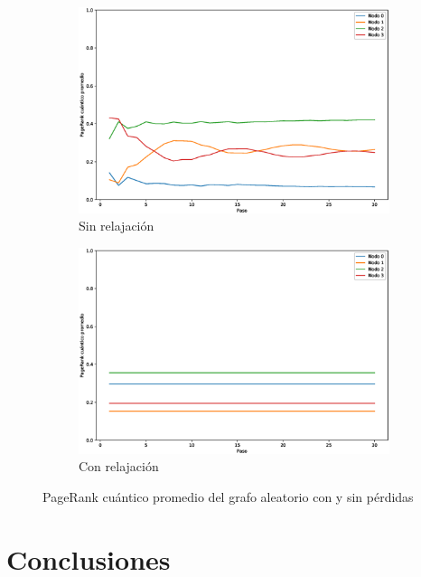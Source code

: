 \documentclass[xetex,mathserif,serif]{beamer}
\begin{document}
\begin{frame}
\begin{figure}[H]
    \centering
    \begin{subfigure}[m]{0.45\textwidth}
        \centering
        \includegraphics[width=0.9\linewidth]{img/any-mean-lossless.eps}
        \caption{Sin relajación}
    \end{subfigure}
    \begin{subfigure}[m]{0.45\textwidth}
        \centering
        \includegraphics[width=0.9\linewidth]{img/any-mean-lossy.eps}
        \caption{Con relajación}
    \end{subfigure}
    \caption[PageRank cuántico promedio del grafo aleatorio con y sin pérdidas]{PageRank cuántico promedio del grafo aleatorio con y sin pérdidas}
    \label{fig:meananylossy}
\end{figure}


\end{frame}

\section{Conclusiones}
\end{document}
